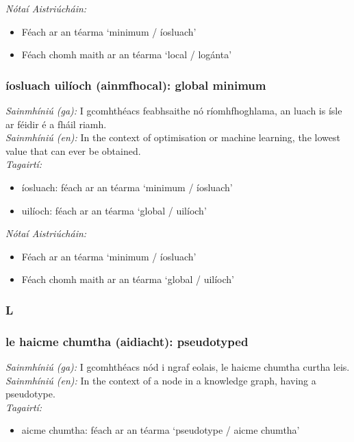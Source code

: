  \noindent \textit{Nótaí Aistriúcháin:}
\begin{itemize}
	\item Féach ar an téarma `minimum / íosluach'
	\item Féach chomh maith ar an téarma `local / logánta'
\end{itemize}


\subsubsection*{íosluach uilíoch (ainmfhocal): global minimum}
 \noindent \textit{Sainmhíniú (ga):} I gcomhthéacs feabhsaithe nó ríomhfhoghlama, an luach is  ísle ar féidir é a fháil riamh.
\\
 \noindent \textit{Sainmhíniú (en):} In the context of optimisation or machine learning, the lowest value that can ever be obtained.
\\
 \noindent \textit{Tagairtí:}
\begin{itemize}
	\item íosluach: féach ar an téarma `minimum / íosluach'
	\item uilíoch: féach ar an téarma `global / uilíoch'
\end{itemize}

 \noindent \textit{Nótaí Aistriúcháin:}
\begin{itemize}
	\item Féach ar an téarma `minimum / íosluach'
	\item Féach chomh maith ar an téarma `global / uilíoch'
\end{itemize}


 \subsubsection*{L}

\subsubsection*{le haicme chumtha (aidiacht): pseudotyped}
 \noindent \textit{Sainmhíniú (ga):} I gcomhthéacs nód i ngraf eolais, le haicme chumtha curtha leis.
\\
 \noindent \textit{Sainmhíniú (en):} In the context of a node in a knowledge graph, having a pseudotype.
\\
 \noindent \textit{Tagairtí:}
\begin{itemize}
	\item aicme chumtha: féach ar an téarma `pseudotype / aicme chumtha'
\end{itemize}

